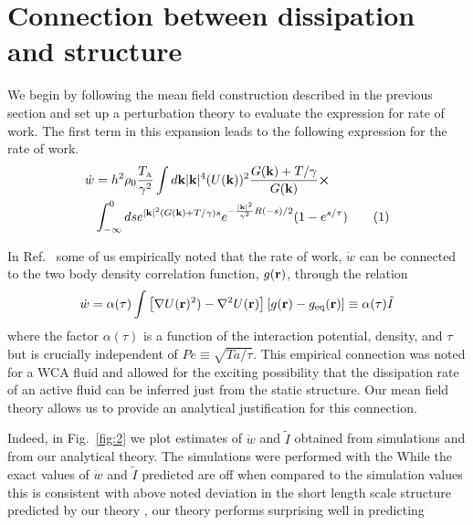 \documentclass[amsmath,preprintnumbers,10pt,nofootinbib,prl,twocolumn]{revtex4-1}
\newcommand{\A}{\text{\tiny{A}}}
\newcommand\numberthis{\addtocounter{equation}{1}\tag{\theequation}}
\begin{document}
\section{Connection between dissipation and structure}
We begin by following the mean field construction described in the previous section and set up a perturbation theory to evaluate the expression for rate of work. The first term in this expansion leads to the following expression for the rate of work. 
\begin{align*}\label{eq:final_expression_wdot}
    \dot{w} & = h^2 \rho_0 \dfrac{T_\A}{\gamma^2} \int d{\bf k} |{\bf k}|^4 (U({\bf k}))^2 \dfrac{ G({\bf k}) + T/ \gamma}{G({\bf k})} \cross \\
& \int_{-\infty}^0 ds e^{|{\bf k}|^2 ( G({\bf k}) + T/ \gamma)s}  e^{-\frac{|{\bf k}|^2}{\gamma^2} R(-s)/2} (1-e^{s/\tau}) \numberthis
\end{align*}



In Ref.~\cite{Suri2019} some of us empirically noted that the rate of work, $\dot{w}$ can be connected to the two body density correlation function, $g(\bf r)$, through the relation
\begin{equation}
    \dot{w}=\alpha (\tau) \int \left[\nabla U({\bf r})^2)-\nabla^2 U({\bf r})\right][g({\bf r})-g_{\rm eq}({\bf r})]\equiv \alpha (\tau) \tilde I
\end{equation}
where the factor $\alpha(\tau)$ is a function of the interaction potential, density, and $\tau$ but is crucially independent of $Pe\equiv \sqrt{Ta/\tau}$. This empirical connection was noted for a WCA fluid and allowed for the exciting possibility that the dissipation rate of an active fluid can be inferred just from the static structure. Our mean field theory allows us to provide an analytical justification for this connection. 

Indeed, in Fig.~\ref{fig:2} we plot estimates of $\dot{w}$ and $\tilde I$ obtained from simulations and from our analytical theory. The simulations were performed with the While the exact values of $\dot{w}$ and $\tilde I$ predicted are off when compared to the simulation values \texendash this is consistent with above noted deviation in the short length scale structure predicted by our theory \texendash, our theory performs surprising well in predicting 

\end{document}
